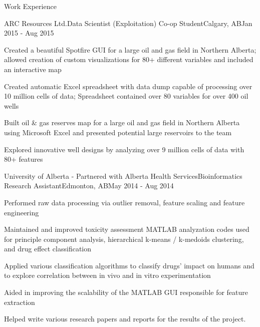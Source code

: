\documentclass{article}
\newlength{\tabin}
\newlength{\secsep}
\newcommand{\lineunder}{\vspace*{-8pt} \\ \hspace*{-6pt} \hrulefill \\ \vspace*{-15pt}}
\newenvironment{tabbedsection}[1]{
  \begin{list}{}{
      \setlength{\itemsep}{0pt}
      \setlength{\labelsep}{0pt}
      \setlength{\labelwidth}{0pt}
      \setlength{\leftmargin}{\tabin}
      \setlength{\rightmargin}{\tabin}
      \setlength{\listparindent}{0pt}
      \setlength{\parsep}{0pt}
      \setlength{\parskip}{0pt}
      \setlength{\partopsep}{0pt}
      \setlength{\topsep}{#1}
    }
  \item[]
}{\end{list}}
\newenvironment{resume_section}[1]{
  \filbreak
  \vspace{2\secsep}
  \textsc{\large#1}
  \lineunder
  \begin{tabbedsection}{\secsep}
}{\end{tabbedsection}}
\newenvironment{subitems}{
  \renewcommand{\labelitemi}{-}
  \begin{itemize}
      \setlength{\labelsep}{1em}
}{\end{itemize}}
\newenvironment{resume_employer}[4]{
  \vspace{\secsep}
  \textbf{#1} \\ 
  \indent {\small #2} \hfill {\footnotesize#3 (#4)}
  \begin{tabbedsection}{0pt}
  \begin{subitems}
}{\end{subitems}\end{tabbedsection}}
\begin{document}
\begin{resume_section}{Work Experience}
  \begin{resume_employer}{ARC Resources Ltd.}{Data Scientist (Exploitation) Co-op Student}{Calgary, AB}{Jan 2015 - Aug 2015}
    \item Created a beautiful Spotfire GUI for a large oil and gas field in Northern Alberta; allowed creation of custom visualizations for 80+ different variables and included an interactive map
    \item Created automatic Excel spreadsheet with data dump capable of processing over 10 million cells of data; Spreadsheet contained over 80 variables for over 400 oil wells
    \item Built oil \& gas reserves map for a large oil and gas field in Northern Alberta using Microsoft Excel and presented potential large reservoirs to the team
    \item Explored innovative well designs by analyzing over 9 million cells of data with 80+ features
  \end{resume_employer}
  
    \begin{resume_employer}{University of Alberta - Partnered with Alberta Health Services}{Bioinformatics Research Assistant}{Edmonton, AB}{May 2014 - Aug 2014}
    \item Performed raw data processing via outlier removal, feature scaling and feature engineering
    \item Maintained and improved toxicity assessment MATLAB analyzation codes used for principle component analysis, hierarchical k-means / k-medoids clustering, and drug effect classification
    \item Applied various classification algorithms to classify drugs’ impact on humans and to explore correlation between in vivo and in vitro experimentation
    \item Aided in improving the scalability of the MATLAB GUI responsible for feature extraction
    \item Helped write various research papers and reports for the results of the project.
  \end{resume_employer}
  
\end{resume_section}
\end{document}
